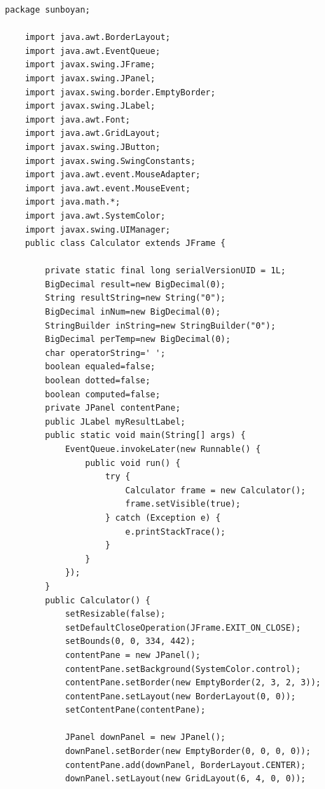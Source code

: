 \documentclass{ctexart}
\begin{document}
\begin{lstlisting}[caption=冗杂的代码]
    package sunboyan;

    import java.awt.BorderLayout;
    import java.awt.EventQueue;
    import javax.swing.JFrame;
    import javax.swing.JPanel;
    import javax.swing.border.EmptyBorder;
    import javax.swing.JLabel;
    import java.awt.Font;
    import java.awt.GridLayout;
    import javax.swing.JButton;
    import javax.swing.SwingConstants;
    import java.awt.event.MouseAdapter;
    import java.awt.event.MouseEvent;
    import java.math.*;
    import java.awt.SystemColor;
    import javax.swing.UIManager;
    public class Calculator extends JFrame {
        
        private static final long serialVersionUID = 1L;
        BigDecimal result=new BigDecimal(0);
        String resultString=new String("0");
        BigDecimal inNum=new BigDecimal(0);
        StringBuilder inString=new StringBuilder("0");
        BigDecimal perTemp=new BigDecimal(0);
        char operatorString=' ';
        boolean equaled=false;
        boolean dotted=false;	
        boolean computed=false;
        private JPanel contentPane;
        public JLabel myResultLabel;
        public static void main(String[] args) {
            EventQueue.invokeLater(new Runnable() {
                public void run() {
                    try {
                        Calculator frame = new Calculator();
                        frame.setVisible(true);
                    } catch (Exception e) {
                        e.printStackTrace();
                    }
                }
            });
        }
        public Calculator() {
            setResizable(false);
            setDefaultCloseOperation(JFrame.EXIT_ON_CLOSE);
            setBounds(0, 0, 334, 442);
            contentPane = new JPanel();
            contentPane.setBackground(SystemColor.control);
            contentPane.setBorder(new EmptyBorder(2, 3, 2, 3));
            contentPane.setLayout(new BorderLayout(0, 0));
            setContentPane(contentPane);
            
            JPanel downPanel = new JPanel();
            downPanel.setBorder(new EmptyBorder(0, 0, 0, 0));
            contentPane.add(downPanel, BorderLayout.CENTER);
            downPanel.setLayout(new GridLayout(6, 4, 0, 0));
            

\end{lstlisting}
\end{document}

